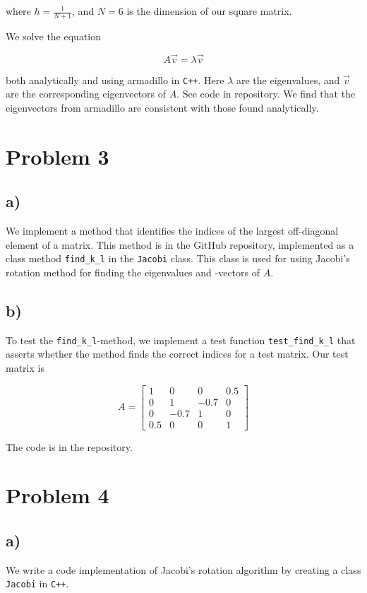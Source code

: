 \documentclass[english,notitlepage]{article}  %
\begin{document}
where $h = \frac{1}{N+1}$, and $N = 6$ is the dimension of our square matrix.

We solve the equation

\begin{equation*}
    A \vec{v} = \lambda \vec{v}
\end{equation*}

both analytically and using armadillo in \lstinline{C++}. Here $\lambda$ are the
eigenvalues, and $\vec{v}$ are the corresponding eigenvectors of $A$. See code
in repository. We find that the eigenvectors from armadillo are consistent with
those found analytically.


\section*{Problem 3}
\subsection*{a)}
We implement a method that identifies the indices of the largest off-diagonal element of a matrix. This method is in the GitHub repository, implemented as a class method \lstinline{find_k_l} in the \lstinline{Jacobi} class. This class is used for using Jacobi's rotation method for finding the eigenvalues and -vectors of $A$.

\subsection*{b)}
To test the \lstinline{find_k_l}-method, we implement a test function \lstinline{test_find_k_l} that asserts whether the method finds the correct indices for a test matrix. Our test matrix is

\begin{equation}
  A = \begin{bmatrix}1 & 0 & 0 & 0.5 \\
  0 & 1 & -0.7 & 0 \\
  0 & -0.7 & 1 & 0 \\
  0.5 & 0 & 0 & 1 \end{bmatrix}
\end{equation}

The code is in the repository.

\section*{Problem 4}
\subsection*{a)}
We write a code implementation of Jacobi's rotation algorithm by creating a class \lstinline{Jacobi} in \lstinline{C++}.
\end{document}
